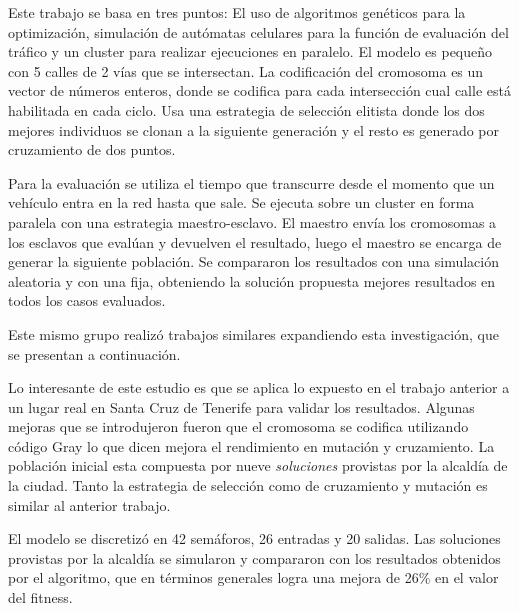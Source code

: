 \begin{itemize}
\begin{item}

Este trabajo se basa en tres puntos: El uso de algoritmos genéticos para la optimización, simulación de autómatas celulares para la función de evaluación del tráfico y un cluster para realizar ejecuciones en paralelo.
El modelo es pequeño con 5 calles de 2 vías que se intersectan.
La codificación del cromosoma es un vector de números enteros, donde se codifica para cada intersección cual calle está habilitada en cada ciclo.
Usa una estrategia de selección elitista donde los dos mejores individuos se clonan a la siguiente generación y el resto es generado por cruzamiento de dos puntos.

Para la evaluación se utiliza el tiempo que transcurre desde el momento que un vehículo entra en la red hasta que sale. Se ejecuta sobre un cluster en forma paralela con una estrategia maestro-esclavo. El maestro envía los cromosomas a los esclavos que evalúan y devuelven el resultado, luego el maestro se encarga de generar la siguiente población.
Se compararon los resultados con una simulación aleatoria y con una fija, obteniendo la solución propuesta mejores resultados en todos los casos evaluados.
	
Este mismo grupo realizó trabajos similares expandiendo esta investigación, que se presentan a continuación.
\end{item}
	
\begin{item}
Lo interesante de este estudio es que se aplica lo expuesto en el trabajo anterior a un lugar real en Santa Cruz de Tenerife para validar los resultados.
Algunas mejoras que se introdujeron fueron que el cromosoma se codifica utilizando código Gray lo que dicen mejora el rendimiento en mutación y cruzamiento. La población inicial esta compuesta por nueve \emph{soluciones} provistas por la alcaldía de la ciudad. Tanto la estrategia de selección como de cruzamiento y mutación es similar al anterior trabajo.

El modelo se discretizó en 42 semáforos, 26 entradas y 20 salidas.
Las soluciones provistas por la alcaldía se simularon y compararon con los resultados obtenidos por el algoritmo, que en términos generales logra una mejora de 26\% en el valor del fitness.

\end{item}

\begin{item}


\end{item}
\end{itemize}
